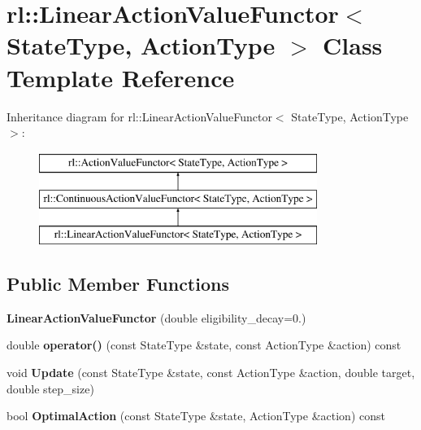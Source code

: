 \hypertarget{classrl_1_1_linear_action_value_functor}{}\section{rl\+:\+:Linear\+Action\+Value\+Functor$<$ State\+Type, Action\+Type $>$ Class Template Reference}
\label{classrl_1_1_linear_action_value_functor}
Inheritance diagram for rl\+:\+:Linear\+Action\+Value\+Functor$<$ State\+Type, Action\+Type $>$\+:\begin{figure}[H]
\begin{center}
\leavevmode
\includegraphics[height=3.000000cm]{classrl_1_1_linear_action_value_functor}
\end{center}
\end{figure}
\subsection*{Public Member Functions}
\begin{DoxyCompactItemize}
\item 
\hypertarget{classrl_1_1_linear_action_value_functor_a84a8c9880033cf465ef8047c3d2172b8}{}\label{classrl_1_1_linear_action_value_functor_a84a8c9880033cf465ef8047c3d2172b8} 
{\bfseries Linear\+Action\+Value\+Functor} (double eligibility\+\_\+decay=0.)
\item 
\hypertarget{classrl_1_1_linear_action_value_functor_a36ed5858d2ded07fd4abe679d23117f9}{}\label{classrl_1_1_linear_action_value_functor_a36ed5858d2ded07fd4abe679d23117f9} 
double {\bfseries operator()} (const State\+Type \&state, const Action\+Type \&action) const
\item 
\hypertarget{classrl_1_1_linear_action_value_functor_ab538729b517740430c17b26f34b08867}{}\label{classrl_1_1_linear_action_value_functor_ab538729b517740430c17b26f34b08867} 
void {\bfseries Update} (const State\+Type \&state, const Action\+Type \&action, double target, double step\+\_\+size)
\item 
\hypertarget{classrl_1_1_linear_action_value_functor_a45efd7efa000a84b90430488a657f661}{}\label{classrl_1_1_linear_action_value_functor_a45efd7efa000a84b90430488a657f661} 
bool {\bfseries Optimal\+Action} (const State\+Type \&state, Action\+Type \&action) const
\end{DoxyCompactItemize}


